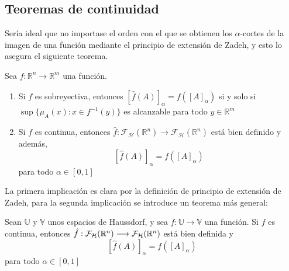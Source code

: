   \subsection{Teoremas de continuidad}
  Sería ideal que no importase el orden con el que se obtienen los $\alpha$-cortes de la imagen de una función mediante el principio de extensión de Zadeh, y esto lo asegura el siguiente teorema.

  \begin{teorema}
  	\label{teorema:contfuzzy}
    Sea $f : \mathbb{R}^n \longrightarrow \mathbb{R}^m$ una función.
    \begin{enumerate}
    \item Si $f$ es sobreyectiva, entonces $[\hat{f}(A)]_\alpha = f([A]_\alpha)$ si y solo si $\sup\{\mu_A(x) : x \in f^{-1}(y)\}$ es alcanzable para todo $y \in \mathbb{R}^m$
    \item Si $f$ es continua, entonces $\hat{f} : \mathcal{F}_\mathcal{H}(\mathbb{R}^n) \longrightarrow \mathcal{F}_\mathcal{H}(\mathbb{R}^n)$ está bien definido y además,  
      $$[\hat{f}(A)]_\alpha = f([A]_\alpha)$$
      para todo $\alpha \in [0, 1]$
    \end{enumerate}
  \end{teorema}

  La primera implicación es clara por la definición de principio de extensión de Zadeh, para la segunda implicación se introduce un teorema más general:


  \begin{teorema}
    Sean $\mathbb{U}$ y $\mathbb{V}$ unos espacios de Haussdorf, y sea $f: \mathbb{U} \longrightarrow \mathbb{V}$ una función. Si $f$ es continua, entonces  $\hat{f} : \mathcal{F}_\mathcal{H}(\mathbb R^n) \longrightarrow \mathcal{F}_\mathcal{H}(\mathbb R^n)$ está bien definida y $$[\hat{f}(A)]_\alpha = f([A]_\alpha)$$
    para todo $\alpha \in [0, 1]$
  \end{teorema}

